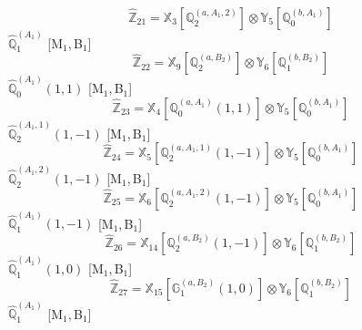 \documentclass[fleqn,10pt,landscape]{article}
\begin{document}
\begin{itemize}
\begin{dmath*}
\hat{\mathbb{Z}}_{21}=\mathbb{X}_{3}[\mathbb{Q}_{2}^{(a,A_{1},2)}] \otimes\mathbb{Y}_{5}[\mathbb{Q}_{0}^{(b,A_{1})}]
\end{dmath*}
\vspace{4mm}
\noindent {} $\,\,\,\hat{\mathbb{Q}}_{1}^{(A_{1})}$ [M$_{1}$,\,B$_{1}$]
\begin{dmath*}
\hat{\mathbb{Z}}_{22}=\mathbb{X}_{9}[\mathbb{Q}_{2}^{(a,B_{2})}] \otimes\mathbb{Y}_{6}[\mathbb{Q}_{1}^{(b,B_{2})}]
\end{dmath*}
\vspace{4mm}
\noindent {} $\,\,\,\hat{\mathbb{Q}}_{0}^{(A_{1})}(1,1)$ [M$_{1}$,\,B$_{1}$]
\begin{dmath*}
\hat{\mathbb{Z}}_{23}=\mathbb{X}_{4}[\mathbb{Q}_{0}^{(a,A_{1})}(1,1)] \otimes\mathbb{Y}_{5}[\mathbb{Q}_{0}^{(b,A_{1})}]
\end{dmath*}
\vspace{4mm}
\noindent {} $\,\,\,\hat{\mathbb{Q}}_{2}^{(A_{1},1)}(1,-1)$ [M$_{1}$,\,B$_{1}$]
\begin{dmath*}
\hat{\mathbb{Z}}_{24}=\mathbb{X}_{5}[\mathbb{Q}_{2}^{(a,A_{1},1)}(1,-1)] \otimes\mathbb{Y}_{5}[\mathbb{Q}_{0}^{(b,A_{1})}]
\end{dmath*}
\vspace{4mm}
\noindent {} $\,\,\,\hat{\mathbb{Q}}_{2}^{(A_{1},2)}(1,-1)$ [M$_{1}$,\,B$_{1}$]
\begin{dmath*}
\hat{\mathbb{Z}}_{25}=\mathbb{X}_{6}[\mathbb{Q}_{2}^{(a,A_{1},2)}(1,-1)] \otimes\mathbb{Y}_{5}[\mathbb{Q}_{0}^{(b,A_{1})}]
\end{dmath*}
\vspace{4mm}
\noindent {} $\,\,\,\hat{\mathbb{Q}}_{1}^{(A_{1})}(1,-1)$ [M$_{1}$,\,B$_{1}$]
\begin{dmath*}
\hat{\mathbb{Z}}_{26}=\mathbb{X}_{14}[\mathbb{Q}_{2}^{(a,B_{2})}(1,-1)] \otimes\mathbb{Y}_{6}[\mathbb{Q}_{1}^{(b,B_{2})}]
\end{dmath*}
\vspace{4mm}
\noindent {} $\,\,\,\hat{\mathbb{Q}}_{1}^{(A_{1})}(1,0)$ [M$_{1}$,\,B$_{1}$]
\begin{dmath*}
\hat{\mathbb{Z}}_{27}=\mathbb{X}_{15}[\mathbb{G}_{1}^{(a,B_{2})}(1,0)] \otimes\mathbb{Y}_{6}[\mathbb{Q}_{1}^{(b,B_{2})}]
\end{dmath*}
\vspace{4mm}
\noindent {} $\,\,\,\hat{\mathbb{Q}}_{1}^{(A_{1})}$ [M$_{1}$,\,B$_{1}$]
\begin{dmath*}

\end{dmath*}
\end{itemize}
\end{document}
